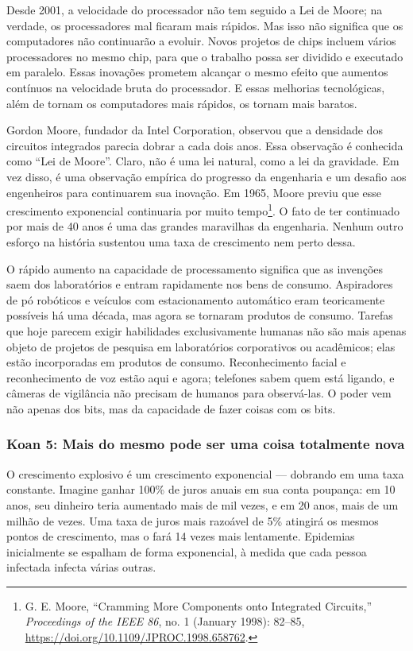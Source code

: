 Desde 2001, a velocidade do processador não tem seguido a Lei de Moore; na 
verdade, os processadores mal ficaram mais rápidos. Mas isso não significa que
os computadores não continuarão a evoluir. Novos projetos de chips
incluem vários processadores no mesmo chip, para que o trabalho possa ser
dividido e executado em paralelo. Essas inovações prometem alcançar o mesmo
efeito que aumentos contínuos na velocidade bruta do processador. E essas
melhorias tecnológicas, além de tornam os computadores mais rápidos, os
tornam mais baratos.

\begin{tcolorbox}[title={Lei de Moore}]
\label{qd:moore}
Gordon Moore, fundador da Intel Corporation, observou que a densidade dos 
circuitos integrados parecia dobrar a cada dois anos. Essa observação é 
conhecida como ``Lei de Moore''. Claro, não é uma lei natural, como a lei da
gravidade. Em vez disso, é uma observação empírica do progresso da engenharia e 
um desafio aos engenheiros para continuarem sua inovação. Em 1965, Moore previu 
que esse crescimento exponencial continuaria por muito tempo\footnote{G. E.
Moore, ``Cramming More Components onto Integrated Circuits,'' \textit{Proceedings
of the IEEE 86}, no. 1 (January 1998): 82--85, \url{https://doi.org/10.1109/JPROC.1998.658762}.}.
O fato de ter continuado por mais de 40 anos é uma das grandes maravilhas da
engenharia. Nenhum outro esforço na história sustentou uma taxa de crescimento
nem perto dessa.
\end{tcolorbox}

O rápido aumento na capacidade de processamento significa que as invenções saem 
dos laboratórios e entram rapidamente nos bens de consumo. Aspiradores de pó 
robóticos e veículos com estacionamento automático eram teoricamente possíveis 
há uma década, mas agora se tornaram produtos de consumo. Tarefas que hoje 
parecem exigir habilidades exclusivamente humanas não são mais apenas objeto de 
projetos de pesquisa em laboratórios corporativos ou acadêmicos; elas estão 
incorporadas em produtos de consumo. Reconhecimento facial e reconhecimento de 
voz estão aqui e agora; telefones sabem quem está ligando, e câmeras de 
vigilância não precisam de humanos para observá-las. O poder vem não apenas dos 
bits, mas da capacidade de fazer coisas com os bits.


\subsubsection*{Koan 5: Mais do mesmo pode ser uma coisa totalmente nova}
O crescimento explosivo é um crescimento exponencial --- dobrando em uma taxa 
constante. Imagine ganhar 100\% de juros anuais em sua conta poupança: em 10 
anos, seu dinheiro teria aumentado mais de mil vezes, e em 20 anos, mais de um 
milhão de vezes. Uma taxa de juros mais razoável de 5\% atingirá os mesmos 
pontos de crescimento, mas o fará 14 vezes mais lentamente. Epidemias 
inicialmente se espalham de forma exponencial, à medida que cada pessoa 
infectada infecta várias outras.

